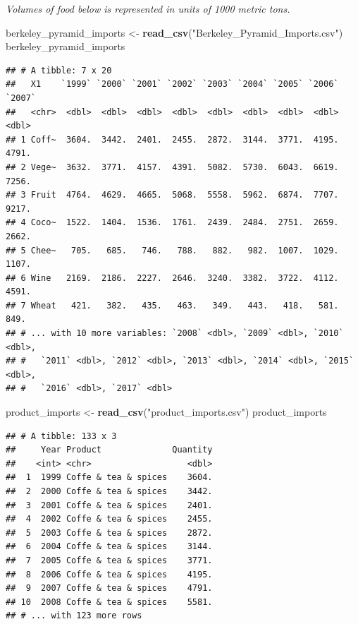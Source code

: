 \documentclass[]{article}
\newenvironment{Shaded}{\begin{snugshade}}{\end{snugshade}}
\newcommand{\KeywordTok}[1]{\textcolor[rgb]{0.13,0.29,0.53}{\textbf{#1}}}
\newcommand{\StringTok}[1]{\textcolor[rgb]{0.31,0.60,0.02}{#1}}
\newcommand{\NormalTok}[1]{#1}
\begin{document}
\emph{Volumes of food below is represented in units of 1000 metric
tons.}

\begin{Shaded}
\begin{Highlighting}[]
\NormalTok{berkeley_pyramid_imports <-}\StringTok{ }\KeywordTok{read_csv}\NormalTok{(}\StringTok{"Berkeley_Pyramid_Imports.csv"}\NormalTok{)}
\NormalTok{berkeley_pyramid_imports}
\end{Highlighting}
\end{Shaded}

\begin{verbatim}
## # A tibble: 7 x 20
##   X1    `1999` `2000` `2001` `2002` `2003` `2004` `2005` `2006` `2007`
##   <chr>  <dbl>  <dbl>  <dbl>  <dbl>  <dbl>  <dbl>  <dbl>  <dbl>  <dbl>
## 1 Coff~  3604.  3442.  2401.  2455.  2872.  3144.  3771.  4195.  4791.
## 2 Vege~  3632.  3771.  4157.  4391.  5082.  5730.  6043.  6619.  7256.
## 3 Fruit  4764.  4629.  4665.  5068.  5558.  5962.  6874.  7707.  9217.
## 4 Coco~  1522.  1404.  1536.  1761.  2439.  2484.  2751.  2659.  2662.
## 5 Chee~   705.   685.   746.   788.   882.   982.  1007.  1029.  1107.
## 6 Wine   2169.  2186.  2227.  2646.  3240.  3382.  3722.  4112.  4591.
## 7 Wheat   421.   382.   435.   463.   349.   443.   418.   581.   849.
## # ... with 10 more variables: `2008` <dbl>, `2009` <dbl>, `2010` <dbl>,
## #   `2011` <dbl>, `2012` <dbl>, `2013` <dbl>, `2014` <dbl>, `2015` <dbl>,
## #   `2016` <dbl>, `2017` <dbl>
\end{verbatim}

\begin{Shaded}
\begin{Highlighting}[]
\NormalTok{product_imports <-}\StringTok{ }\KeywordTok{read_csv}\NormalTok{(}\StringTok{"product_imports.csv"}\NormalTok{)}
\NormalTok{product_imports}
\end{Highlighting}
\end{Shaded}

\begin{verbatim}
## # A tibble: 133 x 3
##     Year Product              Quantity
##    <int> <chr>                   <dbl>
##  1  1999 Coffe & tea & spices    3604.
##  2  2000 Coffe & tea & spices    3442.
##  3  2001 Coffe & tea & spices    2401.
##  4  2002 Coffe & tea & spices    2455.
##  5  2003 Coffe & tea & spices    2872.
##  6  2004 Coffe & tea & spices    3144.
##  7  2005 Coffe & tea & spices    3771.
##  8  2006 Coffe & tea & spices    4195.
##  9  2007 Coffe & tea & spices    4791.
## 10  2008 Coffe & tea & spices    5581.
## # ... with 123 more rows
\end{verbatim}
\end{document}
